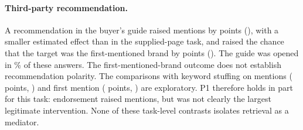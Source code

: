 \paragraph{Third-party recommendation.} A recommendation in the buyer's guide raised mentions by
\AgEMenThirdParty{} points (\AgEMenThirdPartyCI), with a smaller estimated effect than in the supplied-page task, and
raised the chance that the target was the first-mentioned brand by \AgETopThirdParty{} points
(\AgETopThirdPartyCI). The guide was opened in \AgGuideOpenTp\% of these answers. The first-mentioned-brand outcome
does not establish recommendation polarity. The comparisons with keyword stuffing on mentions
(\AgStuffVsTpMen{} points, \AgStuffVsTpMenCI) and first mention (\AgStuffVsTpTopU{} points,
\AgTpVsStuffTopCI) are exploratory. P1 therefore holds in part for this task: endorsement raised mentions, but was not
clearly the largest legitimate intervention. None of these task-level contrasts isolates retrieval as a mediator.
